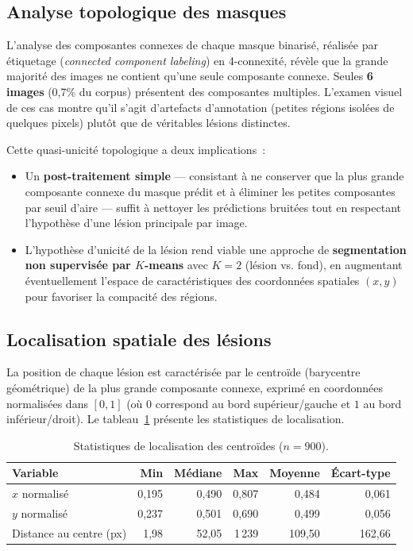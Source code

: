 \documentclass[12pt,a4paper]{article}
\begin{document}
\subsection{Analyse topologique des masques}
\label{subsec:topologie}

L'analyse des composantes connexes de chaque masque binarisé, réalisée par étiquetage (\emph{connected component labeling}) en 4-connexité, révèle que la grande majorité des images ne contient qu'une seule composante connexe. Seules \textbf{6 images} (0,7\% du corpus) présentent des composantes multiples. L'examen visuel de ces cas montre qu'il s'agit d'artefacts d'annotation (petites régions isolées de quelques pixels) plutôt que de véritables lésions distinctes.

Cette quasi-unicité topologique a deux implications~:
\begin{itemize}[nosep]
    \item Un \textbf{post-traitement simple} --- consistant à ne conserver que la plus grande composante connexe du masque prédit et à éliminer les petites composantes par seuil d'aire --- suffit à nettoyer les prédictions bruitées tout en respectant l'hypothèse d'une lésion principale par image.
    \item L'hypothèse d'unicité de la lésion rend viable une approche de \textbf{segmentation non supervisée par $K$-means} avec $K = 2$ (lésion vs. fond), en augmentant éventuellement l'espace de caractéristiques des coordonnées spatiales $(x, y)$ pour favoriser la compacité des régions.
\end{itemize}

\subsection{Localisation spatiale des lésions}
\label{subsec:centroide}

La position de chaque lésion est caractérisée par le centroïde (barycentre géométrique) de la plus grande composante connexe, exprimé en coordonnées normalisées dans $[0, 1]$ (où $0$ correspond au bord supérieur/gauche et $1$ au bord inférieur/droit). Le tableau~\ref{tab:centroide} présente les statistiques de localisation.

\begin{table}[H]
\centering
\caption{Statistiques de localisation des centroïdes ($n = 900$).}
\label{tab:centroide}
\begin{tabular}{l r r r r r}
\toprule
\textbf{Variable} & \textbf{Min} & \textbf{Médiane} & \textbf{Max} & \textbf{Moyenne} & \textbf{Écart-type} \\
\midrule
$x$ normalisé & 0,195 & 0,490 & 0,807 & 0,484 & 0,061 \\
$y$ normalisé & 0,237 & 0,501 & 0,690 & 0,499 & 0,056 \\
Distance au centre (px) & 1,98 & 52,05 & 1\,239 & 109,50 & 162,66 \\
\bottomrule
\end{tabular}
\end{table}
\end{document}
